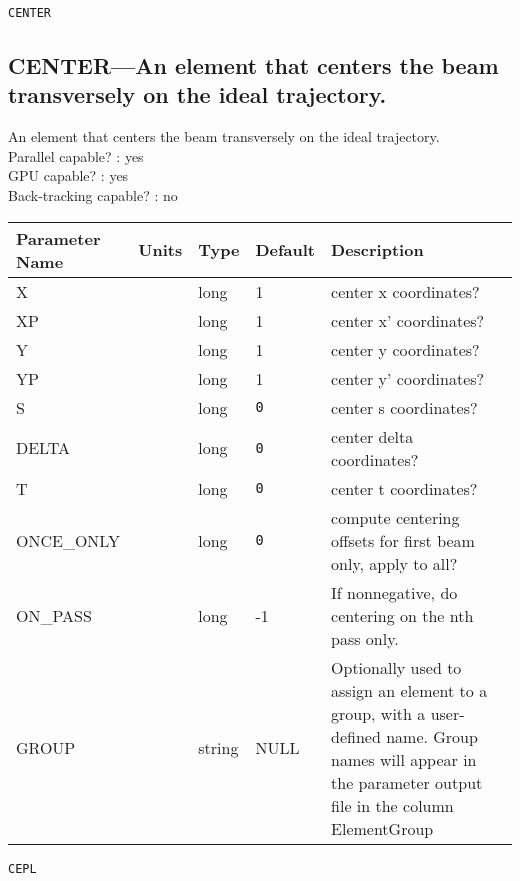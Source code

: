 \vspace*{0.5in}

\newpage
\begin{center}{\Large\verb|CENTER|}\end{center}
\subsection{CENTER---An element that centers the beam transversely on the ideal trajectory.}
An element that centers the beam transversely on the ideal trajectory.
\\
Parallel capable? : yes\\
GPU capable? : yes\\
Back-tracking capable? : no\\
\begin{tabular}{|l|l|l|l|p{\descwidth}|} \hline
Parameter Name & Units & Type & Default & Description \\ \hline 
X &  & long &   1               & center x coordinates?  \\ \hline 
XP &  & long &   1               & center x' coordinates?  \\ \hline 
Y &  & long &   1               & center y coordinates?  \\ \hline 
YP &  & long &   1               & center y' coordinates?  \\ \hline 
S &  & long &  \verb|0| & center s coordinates?  \\ \hline 
DELTA &  & long &  \verb|0| & center delta coordinates?  \\ \hline 
T &  & long &  \verb|0| & center t coordinates?  \\ \hline 
ONCE\_ONLY &  & long &  \verb|0| & compute centering offsets for first beam only, apply to all?  \\ \hline 
ON\_PASS &  & long &   -1              & If nonnegative, do centering on the nth pass only.  \\ \hline 
GROUP &  & string & NULL & Optionally used to assign an element to a group, with a user-defined name.  Group names will appear in the parameter output file in the column ElementGroup  \\ \hline 
\end{tabular}

\newpage
\begin{center}{\Large\verb|CEPL|}\end{center}
